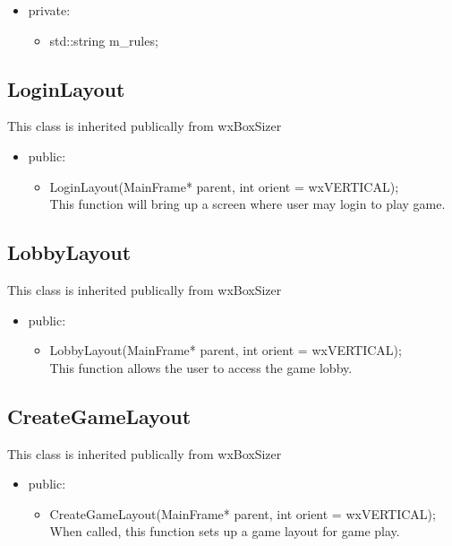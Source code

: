 \documentclass[]{scrartcl}
\begin{document}
 	\begin{itemize}
 		\item 	private:
 		\begin{itemize}
 			\item std::string m\_rules;
 		\end{itemize}
 	\end{itemize}


 \subsection{LoginLayout }
 	This class is inherited  publically from wxBoxSizer
 	\begin{itemize}
 		\item public:
 		\begin{itemize}
 			\item	LoginLayout(MainFrame* parent, int orient = wxVERTICAL);
 				\\This function will bring up a screen where user may login to play game.
 		\end{itemize}
 	\end{itemize}



 \subsection{LobbyLayout}
 	This class is inherited  publically from wxBoxSizer
 		\begin{itemize}
 			\item public:
 			\begin{itemize}
 				\item	LobbyLayout(MainFrame* parent, int orient = wxVERTICAL);
 					\\This function allows the user to access the game lobby.
 			\end{itemize}
 		\end{itemize}

 \subsection{CreateGameLayout}
 	This class is inherited  publically from wxBoxSizer

 		\begin{itemize}
 			\item public:
 			\begin{itemize}
 				\item	CreateGameLayout(MainFrame* parent, int orient = wxVERTICAL);
 					\\When called, this function sets up a game layout for game play.
 			\end{itemize}
 		\end{itemize}
\end{document}

